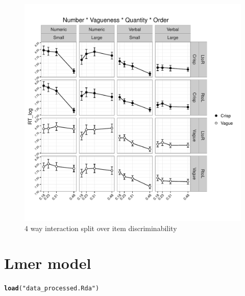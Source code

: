 \documentclass[a4paper,12pt]{article}\usepackage[]{graphicx}\usepackage[]{color}
\makeatletter
\def\maxwidth{ %
  \ifdim\Gin@nat@width>\linewidth
    \linewidth
  \else
    \Gin@nat@width
  \fi
}
\newcommand{\hlstr}[1]{\textcolor[rgb]{0.192,0.494,0.8}{#1}}%
\newcommand{\hlstd}[1]{\textcolor[rgb]{0.345,0.345,0.345}{#1}}%
\newcommand{\hlkwd}[1]{\textcolor[rgb]{0.737,0.353,0.396}{\textbf{#1}}}%
\newenvironment{kframe}{%
 \def\at@end@of@kframe{}%
 \ifinner\ifhmode%
  \def\at@end@of@kframe{\end{minipage}}%
  \begin{minipage}{\columnwidth}%
 \fi\fi%
 \def\FrameCommand##1{\hskip\@totalleftmargin \hskip-\fboxsep
 \colorbox{shadecolor}{##1}\hskip-\fboxsep
     \hskip-\linewidth \hskip-\@totalleftmargin \hskip\columnwidth}%
 \MakeFramed {\advance\hsize-\width
   \@totalleftmargin\z@ \linewidth\hsize
   \@setminipage}}%
 {\par\unskip\endMakeFramed%
 \at@end@of@kframe}
\newenvironment{knitrout}{}{} %
\makeatother
\begin{document}
\clearpage

\begin{knitrout}\scriptsize
{}\color{fgcolor}\begin{figure}[hbtp]

{\centering \includegraphics[width=\maxwidth]{figure/graphics-4waysplit-1} 

}

\caption[4 way interaction split over item discriminability]{4 way interaction split over item discriminability}\label{fig:4waysplit}
\end{figure}


\end{knitrout}

\clearpage
\section{Lmer model}

\begin{knitrout}\scriptsize
{}\color{fgcolor}\begin{kframe}
\begin{alltt}
\hlkwd{load}\hlstd{(}\hlstr{"data_processed.Rda"}\hlstd{)}
\end{alltt}
\end{kframe}
\end{knitrout}
\end{document}

